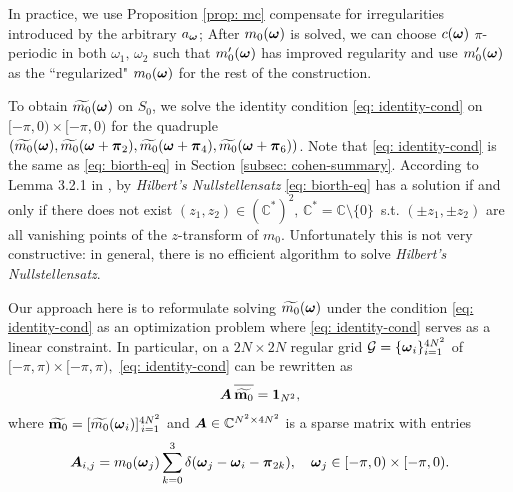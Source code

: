 In practice, we use Proposition \ref{prop: mc} compensate for irregularities introduced by the arbitrary $a_{\boldsymbol{\omega}}$; After $m_0(\boldsymbol{\omega})$ is solved, we can choose $c(\boldsymbol{\omega})$ $\pi$-periodic in both $\omega_1,\,\omega_2$ such that $m_0'(\boldsymbol{\omega})$ has improved regularity and use $m_0'(\boldsymbol{\omega})$ as the ``regularized" $m_0(\boldsymbol{\omega})$ for the rest of the construction.

To obtain $\widetilde{m_{0}}(\boldsymbol{\omega})$ on $S_0$, we solve the identity condition \eqref{eq: identity-cond} on $[-\pi, 0)\times[-\pi, 0 )$ for the quadruple $(\widetilde{m_{0}}(\boldsymbol{\omega}), \widetilde{m_{0}}(\boldsymbol{\omega}+\boldsymbol{\pi}_{2}), \widetilde{m_{0}}(\boldsymbol{\omega}+\boldsymbol{\pi}_{4}), \widetilde{m_{0}}(\boldsymbol{\omega}+\boldsymbol{\pi}_{6}))$. Note that \eqref{eq: identity-cond} is the same as \eqref{eq: biorth-eq} in Section \ref{subsec: cohen-summary}. 
According to Lemma 3.2.1 in \cite{cohen1993compactly}, by {\it Hilbert's Nullstellensatz} \eqref{eq: biorth-eq} has a solution if and only if there does not exist $(z_1,z_2)\in (\mathbb{C}^*)^2,\, \mathbb{C}^* = \mathbb{C}\setminus\{0\}$\, s.t. $(\pm z_1,\pm z_2)$ are all vanishing points of the $z$-transform of $m_0$. Unfortunately this is not very constructive: in general, there is no efficient algorithm to solve {\it Hilbert's Nullstellensatz}.%

Our approach here is to reformulate solving $\widetilde{m_{0}}(\boldsymbol{\omega})$ under the condition \eqref{eq: identity-cond} as an optimization problem where \eqref{eq: identity-cond} serves as a linear constraint. In particular, on a $2N\times 2N$ regular grid $\mathcal{G}=\{\boldsymbol{\omega}_i\}_{i=1}^{4N^2}$ of $[-\pi, \pi)\times[-\pi, \pi), $ \eqref{eq: identity-cond} can be rewritten as
\begin{align}
\V{A}\, \overlinespace{\widetilde{\mathbf{m}_0}}= \mathbf{1}_{N^2}, \label{eq: m0-A}%
\end{align}
where $\widetilde{\mathbf{m}_0} = [\widetilde{m_0}(\boldsymbol{\omega}_i)]_{\,i=1}^{4N^2}$ and $\boldsymbol{A}\in \mathbb{C}^{N^2\times 4N^2}$ is a sparse matrix with entries 
$$\boldsymbol{A}_{i,j} = m_0(\boldsymbol{\omega}_j)\sum_{k=0}^3\delta(\boldsymbol{\omega}_j-\boldsymbol{\omega}_i-\boldsymbol{\pi}_{2k}), \quad \boldsymbol{\omega}_j \in [-\pi,0)\times[-\pi,0).$$

